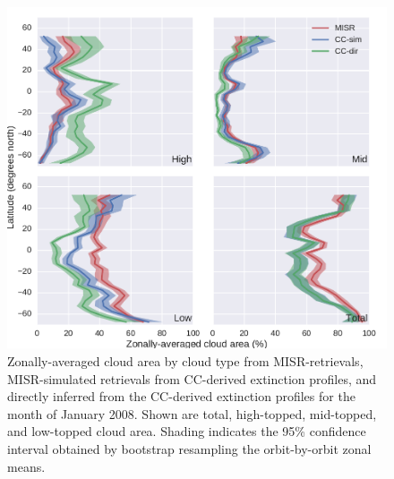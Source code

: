 \begin{figure}[htbp]
\centering
\includegraphics{graphics/misr_cldmisr_zonal_2008-01.pdf}
\caption{\label{fig:misr_cldmisr_zonal_jan}Zonally-averaged cloud area
by cloud type from MISR-retrievals, MISR-simulated retrievals from
CC-derived extinction profiles, and directly inferred from the
CC-derived extinction profiles for the month of January 2008. Shown are
total, high-topped, mid-topped, and low-topped cloud area. Shading
indicates the 95\% confidence interval obtained by bootstrap resampling
the orbit-by-orbit zonal
means.}\label{fig:misrux5fcldmisrux5fzonalux5fjan}
\end{figure}


